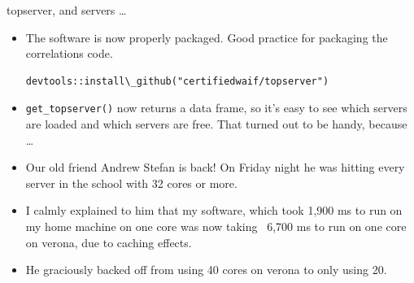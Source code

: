 \documentclass{beamer}
\begin{document}
\begin{frame}{topserver, and servers \ldots}
\begin{itemize}
\item The software is now properly packaged. Good practice for packaging the correlations code.
\small
\begin{verbatim}
devtools::install\_github("certifiedwaif/topserver")
\end{verbatim}
\item \texttt{get\_topserver()} now returns a data frame, so it's easy to see which servers are loaded and 
			which servers are free. That turned out to be handy, because \ldots
\item Our old friend Andrew Stefan is back! On Friday night he was hitting every server in the school with
			32 cores or more.
\item I calmly explained to him that my software, which took 1,900 ms to run on my home machine on one core 
			was now taking ~6,700 ms to run on one core on verona, due to caching effects.
\item He graciously backed off from using 40 cores on verona to only using 20.
\end{itemize}
\end{frame}
\end{document}
